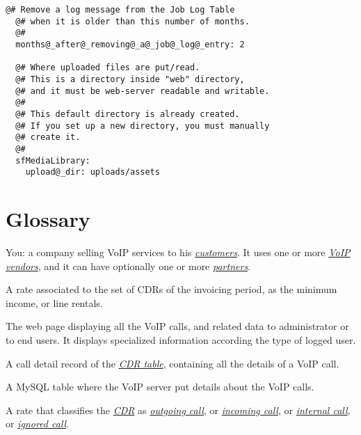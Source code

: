 \documentclass[letterpaper,10pt,english]{sphinxmanual}
\begin{document}
\begin{Verbatim}[commandchars=@\[\]]
  @# Remove a log message from the Job Log Table 
  @# when it is older than this number of months.
  @#
  months@_after@_removing@_a@_job@_log@_entry: 2

  @# Where uploaded files are put/read.
  @# This is a directory inside "web" directory,
  @# and it must be web-server readable and writable.
  @#
  @# This default directory is already created.
  @# If you set up a new directory, you must manually
  @# create it.
  @#
  sfMediaLibrary:
    upload@_dir: uploads/assets
\end{Verbatim}


\section{Glossary}
\label{index:glossary}\begin{description}

\item[{Asterisell owner}] \leavevmode{}\label{index:term-asterisell-owner}
You: a company selling VoIP services to his {\hyperref[index:term-customer]{\emph{customers}}}. It uses one or more {\hyperref[index:term-voip-vendor]{\emph{VoIP vendors}}}, and it can have optionally one or more {\hyperref[index:term-partner]{\emph{partners}}}.


\item[{bundle rate}] \leavevmode{}\label{index:term-bundle-rate}
A rate associated to the set of CDRs of the invoicing period, as the minimum income, or line rentals.


\item[{call report}] \leavevmode{}\label{index:term-call-report}
The web page displaying all the VoIP calls, and related data to administrator or to end users. It displays specialized information according the type of logged user.


\item[{CDR}] \leavevmode{}\label{index:term-cdr}
A call detail record of the {\hyperref[index:term-cdr-table]{\emph{CDR table}}}, containing all the details of a VoIP call.


\item[{CDR table}] \leavevmode{}\label{index:term-cdr-table}
A MySQL table where the VoIP server put details about the VoIP calls.


\item[{classification rate}] \leavevmode{}\label{index:term-classification-rate}
A rate that classifies the {\hyperref[index:term-cdr]{\emph{CDR}}} as {\hyperref[index:term-outgoing-call]{\emph{outgoing call}}}, or {\hyperref[index:term-incoming-call]{\emph{incoming call}}}, or {\hyperref[index:term-internal-call]{\emph{internal call}}}, or {\hyperref[index:term-ignored-call]{\emph{ignored call}}}.



\end{description}
\end{document}
